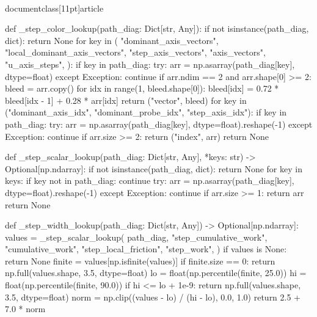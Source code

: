 \\documentclass[11pt]{article}
\begin{document}
\begin{CodeBlock}
{{    def _step_color_lookup(path_diag: Dict[str, Any]):
        if not isinstance(path_diag, dict):
            return None
        for key in (
            "dominant_axis_vectors",
            "local_dominant_axis_vectors",
            "step_axis_vectors",
            "axis_vectors",
            "u_axis_steps",
        ):
            if key in path_diag:
                try:
                    arr = np.asarray(path_diag[key], dtype=float)
                except Exception:
                    continue
                if arr.ndim == 2 and arr.shape[0] >= 2:
                    bleed = arr.copy()
                    for idx in range(1, bleed.shape[0]):
                        bleed[idx] = 0.72 * bleed[idx - 1] + 0.28 * arr[idx]
                    return ("vector", bleed)
        for key in ("dominant_axis_idx", "dominant_probe_idx", "step_axis_idx"):
            if key in path_diag:
                try:
                    arr = np.asarray(path_diag[key], dtype=float).reshape(-1)
                except Exception:
                    continue
                if arr.size >= 2:
                    return ("index", arr)
        return None

    def _step_scalar_lookup(path_diag: Dict[str, Any], *keys: str) -> Optional[np.ndarray]:
        if not isinstance(path_diag, dict):
            return None
        for key in keys:
            if key not in path_diag:
                continue
            try:
                arr = np.asarray(path_diag[key], dtype=float).reshape(-1)
            except Exception:
                continue
            if arr.size >= 1:
                return arr
        return None

    def _step_width_lookup(path_diag: Dict[str, Any]) -> Optional[np.ndarray]:
        values = _step_scalar_lookup(
            path_diag,
            "step_cumulative_work",
            "cumulative_work",
            "step_local_friction",
            "step_work",
        )
        if values is None:
            return None
        finite = values[np.isfinite(values)]
        if finite.size == 0:
            return np.full(values.shape, 3.5, dtype=float)
        lo = float(np.percentile(finite, 25.0))
        hi = float(np.percentile(finite, 90.0))
        if hi <= lo + 1e-9:
            return np.full(values.shape, 3.5, dtype=float)
        norm = np.clip((values - lo) / (hi - lo), 0.0, 1.0)
        return 2.5 + 7.0 * norm

}}
\end{CodeBlock}
\end{document}
